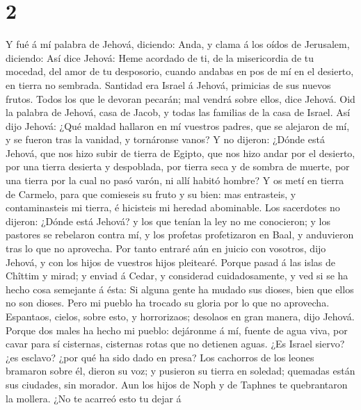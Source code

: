 \hypertarget{section-1}{%
\section{2}\label{section-1}}

 Y fué á mí palabra de Jehová, diciendo: 
Anda, y clama á los oídos de Jerusalem, diciendo: Así dice Jehová: Heme
acordado de ti, de la misericordia de tu mocedad, del amor de tu
desposorio, cuando andabas en pos de mí en el desierto, en tierra no
sembrada.  Santidad era Israel á Jehová, primicias de sus
nuevos frutos. Todos los que le devoran pecarán; mal vendrá sobre ellos,
dice Jehová.  Oid la palabra de Jehová, casa de Jacob, y
todas las familias de la casa de Israel.  Así dijo Jehová:
¿Qué maldad hallaron en mí vuestros padres, que se alejaron de mí, y se
fueron tras la vanidad, y tornáronse vanos?  Y no dijeron:
¿Dónde está Jehová, que nos hizo subir de tierra de Egipto, que nos hizo
andar por el desierto, por una tierra desierta y despoblada, por tierra
seca y de sombra de muerte, por una tierra por la cual no pasó varón, ni
allí habitó hombre?  Y os metí en tierra de Carmelo, para
que comieseis su fruto y su bien: mas entrasteis, y contaminasteis mi
tierra, é hicisteis mi heredad abominable.  Los sacerdotes
no dijeron: ¿Dónde está Jehová? y los que tenían la ley no me
conocieron; y los pastores se rebelaron contra mí, y los profetas
profetizaron en Baal, y anduvieron tras lo que no aprovecha.
 Por tanto entraré aún en juicio con vosotros, dijo
Jehová, y con los hijos de vuestros hijos pleitearé. 
Porque pasad á las islas de Chîttim y mirad; y enviad á Cedar, y
considerad cuidadosamente, y ved si se ha hecho cosa semejante á ésta:
 Si alguna gente ha mudado sus dioses, bien que ellos no
son dioses. Pero mi pueblo ha trocado su gloria por lo que no aprovecha.
 Espantaos, cielos, sobre esto, y horrorizaos; desolaos
en gran manera, dijo Jehová.  Porque dos males ha hecho
mi pueblo: dejáronme á mí, fuente de agua viva, por cavar para sí
cisternas, cisternas rotas que no detienen aguas.  ¿Es
Israel siervo? ¿es esclavo? ¿por qué ha sido dado en presa?
 Los cachorros de los leones bramaron sobre él, dieron su
voz; y pusieron su tierra en soledad; quemadas están sus ciudades, sin
morador.  Aun los hijos de Noph y de Taphnes te
quebrantaron la mollera.  ¿No te acarreó esto tu dejar á
